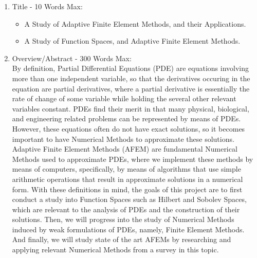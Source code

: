\documentclass[11pt]{article}
\begin{document}
\pagestyle{fancy}
\fancyhead{}
\fancyhead[L]{\textbf{\rightmark}}

\begin{enumerate}

\item Title - 10 Words Max:
\begin{itemize}
\item A Study of Adaptive Finite Element Methods, and their Applications.
\item A Study of Function Spaces, and Adaptive Finite Element Methods.
\end{itemize}

\item Overview/Abstract - 300 Words Max: \\
By definition, Partial Differential Equations (PDE) are equations involving more than one independent variable,
so that the derivatives occuring in the equation are partial derivatives, where a partial derivative is
essentially the rate of change of some variable while holding the several other relevant variables constant.
PDEs find their merit in that many physical, biological, and engineering related problems can be represented by means of PDEs.
However, these equations often do not have exact solutions, so it becomes important to have Numerical Methods to approximate these solutions.
Adaptive Finite Element Methods (AFEM)
are fundamental Numerical Methods used to approximate PDEs, where we implement these methods by means of computers, specifically, by means
of algorithms that use simple arithmetic operations that result in approximate solutions in a numerical form.
With these definitions in mind, the goals of this project are to first conduct a study into Function Spaces such as
Hilbert and Sobolev Spaces, which are relevant to the analysis of PDEs and the construction of their solutions.
Then, we will progress into the study of Numerical Methods induced by weak formulations
of PDEs, namely, Finite Element Methods. And finally, we will study state of the art AFEMs
by researching and applying relevant Numerical Methods from a survey in this topic.


\end{enumerate}
\end{document}
